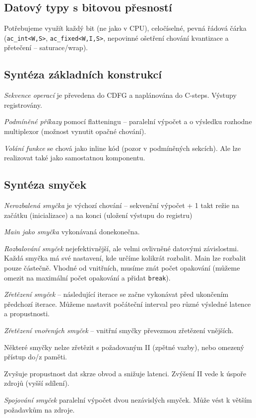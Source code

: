 \documentclass[a4paper, 11pt]{report}
\begin{document}
\subsection{Datový typy s bitovou přesností}
Potřebujeme využít každý bit (ne jako v CPU), celočíselné, pevná řádová čárka (\texttt{ac\_int<W,S>}, \texttt{ac\_fixed<W,I,S>}, nepovinné ošetření chování kvantizace a přetečení -- saturace/wrap).

\subsection{Syntéza základních konstrukcí}
\emph{Sekvence operací} je převedena do CDFG a naplánována do C-steps. Výstupy registrovány.

\emph{Podmíněné příkazy} pomocí flatteningu -- paralelní výpočet a o výsledku rozhodne multiplexor (možnost vynutit opačné chování).

\emph{Volání funkce} se chová jako inline kód (pozor v podmíněných sekcích). Ale lze realizovat také jako samostatnou komponentu.

\subsection{Syntéza smyček}
\emph{Nerozbalená smyčka} je výchozí chování -- sekvenční výpočet + 1 takt režie na začátku (inicializace) a na konci (uložení výstupu do registru)

\emph{Main jako smyčka} vykonávaná donekonečna.

\emph{Rozbalování smyček} nejefektivnější, ale velmi ovlivněné datovými závislostmi. Každá smyčka má své nastavení, kde určíme kolikrát rozbalit. Main lze rozbalit pouze částečně. Vhodné od vnitřních, musíme znát počet opakování (můžeme omezit na maximální počet opakování a přidat \texttt{break}).

\emph{Zřetězení smyček} -- následující iterace se začne vykonávat před ukončením předchozí iterace. Můžeme nastavit počáteční interval pro různé výsledné latence a propustnosti.

\emph{Zřetězení vnořených smyček} -- vnitřní smyčky převezmou zřetězení vnějších.

Některé smyčky nelze zřetězit s požadovaným II (zpětné vazby), nebo omezený přístup do/z paměti.

Zvyšuje propustnost dat skrze obvod a snižuje latenci. Zvýšení II vede k úspoře zdrojů (vyšší sdílení).

\emph{Spojování smyček} paralelní výpočet dvou nezávislých smyček. Může vést k větším požadavkům na zdroje.
\end{document}
